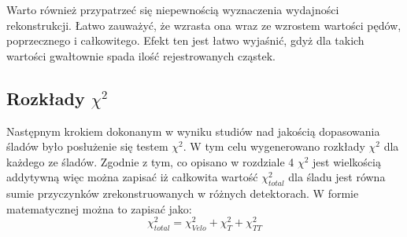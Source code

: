 Warto również przypatrzeć się niepewnością wyznaczenia wydajności rekonstrukcji. Łatwo zauważyć, że wzrasta ona wraz ze wzrostem wartości pędów, poprzecznego i całkowitego. Efekt ten jest łatwo wyjaśnić, gdyż dla takich wartości gwałtownie spada ilość rejestrowanych cząstek.  

\subsection{Rozkłady $\chi^2$}
Następnym krokiem dokonanym w wyniku studiów nad jakością dopasowania śladów było posłużenie się testem $\chi^2$. W tym celu wygenerowano rozkłady $\chi^2$ dla każdego ze śladów. Zgodnie z tym, co opisano w rozdziale 4 $\chi^2$ jest wielkością addytywną więc można zapisać iż całkowita wartość $\chi^2_{total}$ dla śladu jest równa sumie przyczynków zrekonstruowanych w różnych detektorach. W formie matematycznej można to zapisać jako:
\begin{equation}
\chi^2_{total}=\chi^2_{Velo}+\chi^2_{T}+\chi^2_{TT}
\label{chiTotal}
\end{equation} 

